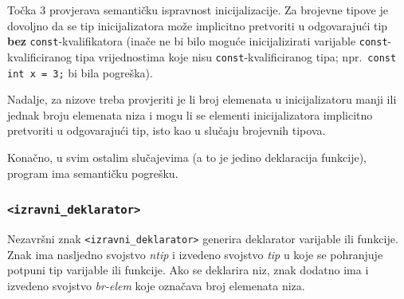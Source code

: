 \documentclass[times, 12pt, utf8]{book}
\begin{document}
\begin{itemize}
Točka 3 provjerava semantičku ispravnost inicijalizacije.
Za brojevne tipove je dovoljno da se tip inicijalizatora može implicitno pretvoriti u odgovarajući tip \textbf{bez} \verb|const|-kvalifikatora (inače ne bi bilo moguće inicijalizirati varijable \verb|const|-kvalificiranog tipa vrijednostima koje nisu \verb|const|-kvalificiranog tipa; npr.~\verb|const int x = 3;| bi bila pogreška).

Nadalje, za nizove treba provjeriti je li broj elemenata u inicijalizatoru manji ili jednak broju elemenata niza i mogu li se elementi inicijalizatora implicitno pretvoriti u odgovarajući tip, isto kao u slučaju brojevnih tipova.

Konačno, u svim ostalim slučajevima (a to je jedino deklaracija funkcije), program ima semantičku pogrešku.

\end{itemize}

\subsubsection{\texttt{<izravni\_deklarator>}}

Nezavršni znak \verb|<izravni_deklarator>| generira deklarator varijable ili funkcije.
Znak ima nasljedno svojstvo \emph{ntip} i izvedeno svojstvo \emph{tip} u koje se pohranjuje potpuni tip varijable ili funkcije.
Ako se deklarira niz, znak dodatno ima i izvedeno svojstvo \emph{br-elem} koje označava broj elemenata niza.
\end{document}
